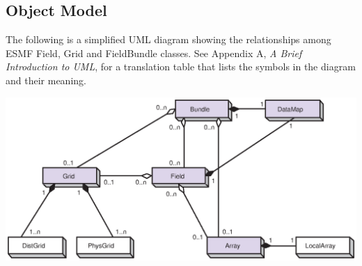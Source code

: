 \subsection{Object Model}

The following is a simplified UML diagram showing the relationships among
ESMF Field, Grid and FieldBundle classes.  See Appendix A, {\it A Brief 
Introduction to UML},
for a translation table that lists the symbols in the diagram and their 
meaning.

\begin{center}
\includegraphics{FieldBundle_obj}   
\end{center}










